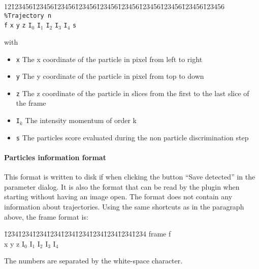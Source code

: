 \documentclass{scrartcl}
\begin{document}
\begin{tabbing}

  12\=123456\=123456\=123456\=123456\=123456\=123456\=123456\=123456\=123456\=123456 \kill
  \>\texttt{\%Trajectory n}  \\
  \>  \texttt{f} \> \texttt{x} \> \texttt{y} \> \texttt{z} \> \texttt{I}$_0$ \> \texttt{I}$_1$ \> \texttt{I}$_2$ \> \texttt{I}$_3$ \> \texttt{I}$_4$ \> \texttt{s} \\

\end{tabbing}
with
\begin{itemize}
\item \texttt{x} The x coordinate of the particle in pixel from left to right
\item \texttt{y} The y coordinate of the particle in pixel from top to down
\item \texttt{z}  The z coordinate of the particle in slices from the first to the last slice of the frame
\item \texttt{I}$_k$  The intensity momentum of order k
\item \texttt{s}  The particles score evaluated during the non particle discrimination step\\
\end{itemize}

\paragraph{Particles information format}
This format is written to disk if when clicking the button ``Save detected'' in the parameter dialog. It is also the format that can be read by the plugin when starting without having an image open. The format does not contain any information about trajectories. Using the same shortcuts as in the paragraph above, the frame format is:
{  \ttfamily
  \begin{tabbing}
    \=1234\=1234\=1234\=1234\=1234\=1234\=1234\=1234\=1234\=1234\kill
    \>frame f\\		
    \>  x \> y \> z \> I$_0$ \> I$_1$ \> I$_2$ \> I$_3$ \> I$_4$ 
  \end{tabbing}
}
The numbers are separated by the white-space character.
\end{document}
